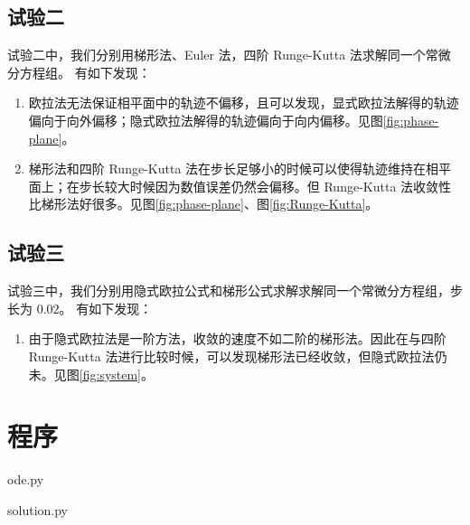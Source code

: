 \documentclass{article}
\begin{document}
\subsection{试验二}
试验二中，我们分别用梯形法、Euler 法，四阶 Runge-Kutta 法求解同一个常微分方程组。
有如下发现：
\begin{enumerate}
    \item 欧拉法无法保证相平面中的轨迹不偏移，且可以发现，显式欧拉法解得的轨迹偏向于向外偏移；隐式欧拉法解得的轨迹偏向于向内偏移。见图\ref{fig:phase-plane}。
    \item 梯形法和四阶 Runge-Kutta 法在步长足够小的时候可以使得轨迹维持在相平面上；在步长较大时候因为数值误差仍然会偏移。但 Runge-Kutta 法收敛性比梯形法好很多。见图\ref{fig:phase-plane}、图\ref{fig:Runge-Kutta}。
\end{enumerate}

\subsection{试验三}
试验三中，我们分别用隐式欧拉公式和梯形公式求解求解同一个常微分方程组，步长为 $0.02$。
有如下发现：
\begin{enumerate}
    \item 由于隐式欧拉法是一阶方法，收敛的速度不如二阶的梯形法。因此在与四阶 Runge-Kutta 法进行比较时候，可以发现梯形法已经收敛，但隐式欧拉法仍未。见图\ref{fig:system}。
\end{enumerate}

\section{程序}
ode.py


solution.py

\end{document}
